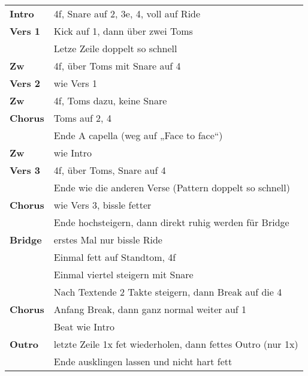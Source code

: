 
\begin{tabular}{p{1.6cm}l}
	\textbf{Intro}  & 4f, Snare auf 2, 3e, 4, voll auf Ride                       \\
	\textbf{Vers 1} & Kick auf 1, dann über zwei Toms                             \\
	                & Letze Zeile doppelt so schnell                              \\
	\textbf{Zw}     & 4f, über Toms mit Snare auf 4                               \\
	\textbf{Vers 2} & wie Vers 1                                                  \\
	\textbf{Zw}     & 4f, Toms dazu, keine Snare                                  \\
	\textbf{Chorus} & Toms auf 2, 4                                               \\
	                & Ende A capella (weg auf „Face to face“)                     \\
	\textbf{Zw}     & wie Intro                                                   \\
	\textbf{Vers 3} & 4f, über Toms, Snare auf 4                                  \\
	                & Ende wie die anderen Verse (Pattern doppelt so schnell)     \\
	\textbf{Chorus} & wie Vers 3, bissle fetter                                   \\
	                & Ende hochsteigern, dann direkt ruhig werden für Bridge      \\
	\textbf{Bridge} & erstes Mal nur bissle Ride                                  \\
	                & Einmal fett auf Standtom, 4f                                \\
	                & Einmal viertel steigern mit Snare                           \\
	                & Nach Textende 2 Takte steigern, dann Break auf die 4        \\
	\textbf{Chorus} & Anfang Break, dann ganz normal weiter auf 1                 \\
	                & Beat wie Intro                                              \\
	\textbf{Outro}  & letzte Zeile 1x fet wiederholen, dann fettes Outro (nur 1x) \\
	                & Ende ausklingen lassen und nicht hart fett                  \\
\end{tabular}
